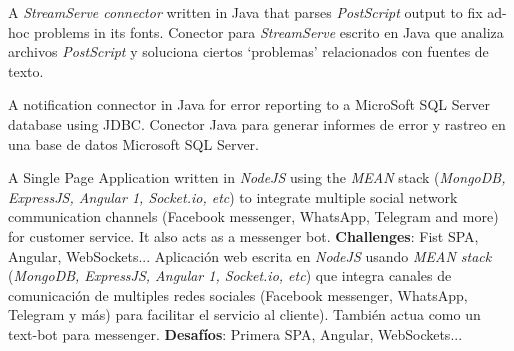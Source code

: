 
    {\ml
    {A \textit{StreamServe connector} written in Java that parses
    \textit{PostScript} output to fix ad-hoc problems in its fonts.}
    {Conector para \textit{StreamServe} escrito en Java que analiza archivos
    \textit{PostScript} y soluciona ciertos `problemas' relacionados con fuentes
    de texto.}
}


    {\ml
    {A notification connector in Java for error reporting to a MicroSoft SQL
    Server database using JDBC.}
    {Conector Java para generar informes de error y rastreo en una base de
    datos Microsoft SQL Server.}
}


    {\ml
    {A Single Page Application written in \textit{NodeJS} using the
    \textit{MEAN} stack (\textit{MongoDB, ExpressJS, Angular 1, Socket.io,
    etc}) to integrate multiple social network communication channels (Facebook
    messenger, WhatsApp, Telegram and more) for customer service. It also acts
    as a messenger bot. \textbf{Challenges}: Fist SPA, Angular, WebSockets...}
    {Aplicación web escrita en \textit{NodeJS} usando \textit{MEAN stack}
    (\textit{MongoDB, ExpressJS, Angular 1, Socket.io, etc}) que integra
    canales de comunicación de multiples redes sociales (Facebook messenger,
    WhatsApp, Telegram y más) para facilitar el servicio al cliente). También
    actua como un text-bot para messenger. \textbf{Desafíos}: Primera SPA,
    Angular, WebSockets...}
}


